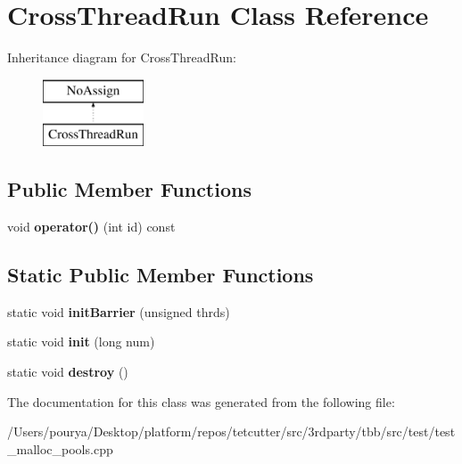 \hypertarget{classCrossThreadRun}{}\section{Cross\+Thread\+Run Class Reference}
\label{classCrossThreadRun}
Inheritance diagram for Cross\+Thread\+Run\+:\begin{figure}[H]
\begin{center}
\leavevmode
\includegraphics[height=2.000000cm]{classCrossThreadRun}
\end{center}
\end{figure}
\subsection*{Public Member Functions}
\begin{DoxyCompactItemize}
\item 
\hypertarget{classCrossThreadRun_aaa311af9901df0afaab22ea2dd4dc3aa}{}void {\bfseries operator()} (int id) const \label{classCrossThreadRun_aaa311af9901df0afaab22ea2dd4dc3aa}

\end{DoxyCompactItemize}
\subsection*{Static Public Member Functions}
\begin{DoxyCompactItemize}
\item 
\hypertarget{classCrossThreadRun_aafd07ae1418c5517d101aa4b8d1097d9}{}static void {\bfseries init\+Barrier} (unsigned thrds)\label{classCrossThreadRun_aafd07ae1418c5517d101aa4b8d1097d9}

\item 
\hypertarget{classCrossThreadRun_ad254b8783639535bf3239c10fdb2c785}{}static void {\bfseries init} (long num)\label{classCrossThreadRun_ad254b8783639535bf3239c10fdb2c785}

\item 
\hypertarget{classCrossThreadRun_a1f2d69a8a802d5aa59b9d8125adebe88}{}static void {\bfseries destroy} ()\label{classCrossThreadRun_a1f2d69a8a802d5aa59b9d8125adebe88}

\end{DoxyCompactItemize}


The documentation for this class was generated from the following file\+:\begin{DoxyCompactItemize}
\item 
/\+Users/pourya/\+Desktop/platform/repos/tetcutter/src/3rdparty/tbb/src/test/test\+\_\+malloc\+\_\+pools.\+cpp\end{DoxyCompactItemize}
